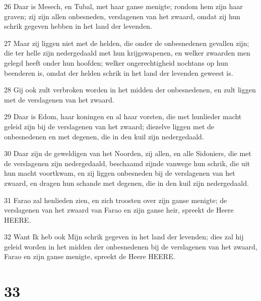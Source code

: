\par 26 Daar is Mesech, en Tubal, met haar ganse menigte; rondom hem zijn haar graven; zij zijn allen onbesneden, verslagenen van het zwaard, omdat zij hun schrik gegeven hebben in het land der levenden.
\par 27 Maar zij liggen niet met de helden, die onder de onbesnedenen gevallen zijn; die ter helle zijn nedergedaald met hun krijgswapenen, en welker zwaarden men gelegd heeft onder hun hoofden; welker ongerechtigheid nochtans op hun beenderen is, omdat der helden schrik in het land der levenden geweest is.
\par 28 Gij ook zult verbroken worden in het midden der onbesnedenen, en zult liggen met de verslagenen van het zwaard.
\par 29 Daar is Edom, haar koningen en al haar vorsten, die met hunlieder macht geleid zijn bij de verslagenen van het zwaard; diezelve liggen met de onbesnedenen en met degenen, die in den kuil zijn nedergedaald.
\par 30 Daar zijn de geweldigen van het Noorden, zij allen, en alle Sidoniers, die met de verslagenen zijn nedergedaald, beschaamd zijnde vanwege hun schrik, die uit hun macht voortkwam, en zij liggen onbesneden bij de verslagenen van het zwaard, en dragen hun schande met degenen, die in den kuil zijn nedergedaald.
\par 31 Farao zal henlieden zien, en zich troosten over zijn ganse menigte; de verslagenen van het zwaard van Farao en zijn ganse heir, spreekt de Heere HEERE.
\par 32 Want Ik heb ook Mijn schrik gegeven in het land der levenden; dies zal hij geleid worden in het midden der onbesnedenen bij de verslagenen van het zwaard, Farao en zijn ganse menigte, spreekt de Heere HEERE.

\chapter{33}

